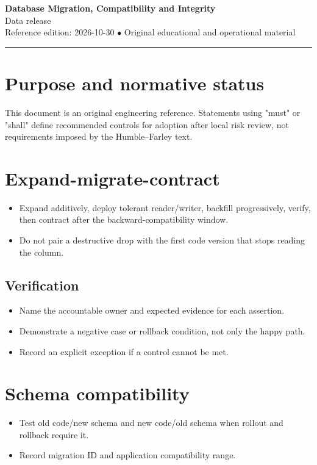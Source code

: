 \documentclass[10pt,letterpaper]{article}
\begin{document}
\begin{center}
{\LARGE\bfseries\color{cdblue}Database Migration, Compatibility and Integrity}\\[7pt]
{\large Data release}\\[6pt]
{\small Reference edition: 2026-10-30 $\bullet$ Original educational and operational material}
\end{center}
\noindent\color{cdblue}\rule{\linewidth}{1.2pt}\color{black}
\vspace{0.4em}
\section{Purpose and normative status}
This document is an original engineering reference. Statements using "must" or "shall" define recommended controls for adoption after local risk review, not requirements imposed by the Humble--Farley text.


\section{Expand-migrate-contract}
\begin{itemize}
\item Expand additively, deploy tolerant reader/writer, backfill progressively, verify, then contract after the backward-compatibility window.
\item Do not pair a destructive drop with the first code version that stops reading the column.
\end{itemize}
\subsection{Verification}
\begin{itemize}
\item Name the accountable owner and expected evidence for each assertion.
\item Demonstrate a negative case or rollback condition, not only the happy path.
\item Record an explicit exception if a control cannot be met.
\end{itemize}


\section{Schema compatibility}
\begin{itemize}
\item Test old code/new schema and new code/old schema when rollout and rollback require it.
\item Record migration ID and application compatibility range.
\end{itemize}
\end{document}
